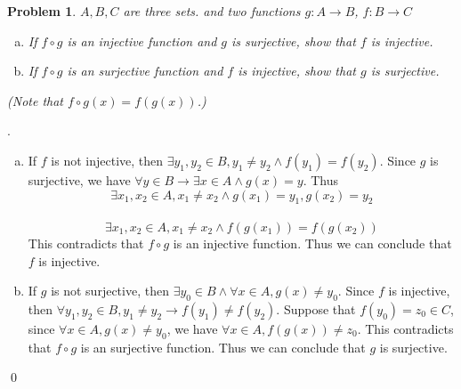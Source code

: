 \documentclass[12pt]{article}
\newtheorem{hw}{Problem}
\newenvironment{sol}
{\par\vspace{3mm}\noindent{\it Solution}.}
{\qed}
\begin{document}
	
	\begin{hw}$A,B,C$ are three sets. and two functions $g:A\rightarrow B$, $f:B\rightarrow C$
		\begin{enumerate}[a)~~]
			\item If $f\circ g$ is an injective function and $g$ is surjective, show that $f$ is injective.
			\item If $f\circ g$ is an surjective function and $f$ is injective, show that $g$ is surjective.
		\end{enumerate}
		(Note that $f\circ g (x) =f(g(x))$.)
	\end{hw}
	\begin{sol}
		\begin{enumerate}[a)~~]
			\item If $f$ is not injective, then $\exists y_{1}, y_{2} \in B, y_{1} \neq y_{2} \land f(y_{1}) = f(y_{2}) $. Since $g$ is surjective, we have $\forall y \in B \longrightarrow \exists x \in A \land g(x) = y$. Thus $$\exists x_{1}, x_{2} \in A, x_{1} \neq x_{2} \land g(x_{1}) = y_{1}, g(x_{2}) = y_{2}$$ \\ $$\exists x_{1}, x_{2} \in A, x_{1} \neq x_{2} \land f(g(x_{1})) = f(g(x_{2}))$$This contradicts that $f\circ g$ is an injective function. Thus we can conclude that $f$ is injective.
			
			\item If $g$ is not surjective, then $\exists y_{0} \in B \land \forall x \in A, g(x) \neq y_{0}$. Since $f$ is injective, then $\forall y_{1}, y_{2} \in B, y_{1} \neq y_{2} \longrightarrow f(y_{1}) \neq f(y_{2})$. Suppose that $f(y_{0}) = z_{0} \in C$, since $\forall x \in A, g(x) \neq y_{0}$, we have $\forall x \in A, f(g(x)) \neq z_{0}$. This contradicts that $f\circ g$ is an surjective function. Thus we can conclude that $g$ is surjective.
		\end{enumerate}
	\end{sol}
	
\end{document}
